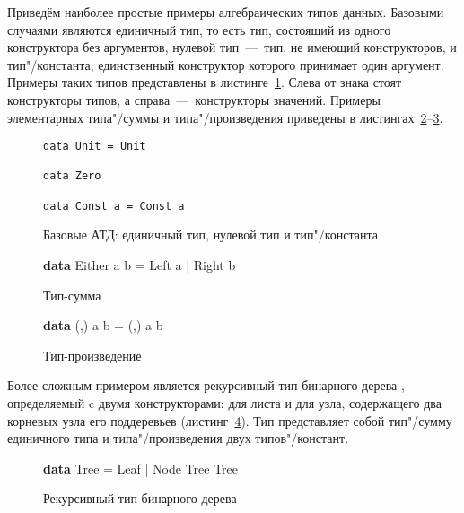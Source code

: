 Приведём наиболее простые примеры алгебраических типов данных.
Базовыми случаями являются единичный тип, то есть тип, состоящий
из одного конструктора без аргументов, нулевой тип~---~тип, не
имеющий конструкторов, и тип"/константа, единственный конструктор
которого принимает один аргумент. Примеры таких типов
представлены в листинге~\ref{list:base}. Слева от знака \texttts{=}
стоят конструкторы типов, а справа~---~конструкторы значений.
Примеры элементарных типа"/суммы и типа"/произведения приведены
в листингах~\ref{list:sum}--\ref{list:prod}.
\begin{figure}[h]
\begin{framed}
\vspace{-0.25cm}
\begin{lstlisting}
data Unit = Unit

data Zero

data Const a = Const a
\end{lstlisting}
\vspace{-0.25cm}
\end{framed}
\caption{Базовые АТД: единичный тип, нулевой тип и тип"/константа}
\label{list:base}
\end{figure}
\begin{figure}[h]
\begin{framed}
{\ttfamily\small
\textbf{data} Either a b = Left a | Right b}
\end{framed}
\caption{Тип-сумма}
\label{list:sum}
\end{figure}
\begin{figure}[h]
\begin{framed}
{\ttfamily\small
\textbf{data} (,) a b = (,) a b}
\end{framed}
\caption{Тип-произведение}
\label{list:prod}
\end{figure}

Более сложным примером является рекурсивный тип бинарного дерева
, определяемый c двумя конструкторами:  для
листа и  для узла, содержащего два корневых узла его
поддеревьев (листинг~\ref{list:bin-tree}). Тип 
представляет собой тип"/сумму единичного типа и типа"/произведения
двух типов"/констант.
\begin{figure}[h]
\begin{framed}
{\ttfamily\small
\textbf{data} Tree = Leaf | Node Tree Tree}
\end{framed}
\caption{Рекурсивный тип бинарного дерева}
\label{list:bin-tree}
\end{figure}

